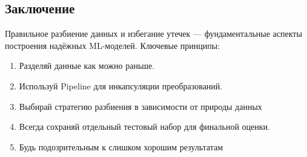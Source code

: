 \subsection*{Заключение}

Правильное разбиение данных и избегание утечек --- фундаментальные аспекты построения надёжных ML-моделей.
Ключевые принципы:

\begin{enumerate}
    \item Разделяй данные как можно раньше.
    \item Используй Pipeline для инкапсуляции преобразований.
    \item Выбирай стратегию разбиения в зависимости от природы данных
    \item Всегда сохраняй отдельный тестовый набор для финальной оценки.
    \item Будь подозрительным к слишком хорошим результатам
\end{enumerate}